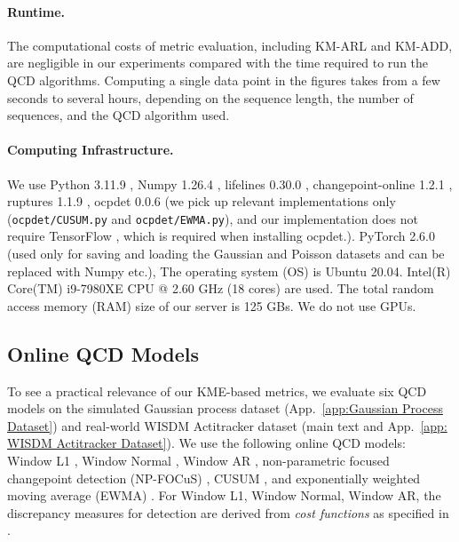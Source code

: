 \documentclass{article}
\theoremstyle{plain}
\theoremstyle{definition}
\theoremstyle{remark}
\begin{document}
\paragraph{Runtime.}
The computational costs of metric evaluation, including KM-ARL and KM-ADD, are negligible in our experiments compared with the time required to run the QCD algorithms. Computing a single data point in the figures takes from a few seconds to several hours, depending on the sequence length, the number of sequences, and the QCD algorithm used.

\paragraph{Computing Infrastructure.}
We use Python 3.11.9 \citep{Python3}, 
Numpy 1.26.4 \citep{numpy}, 
lifelines 0.30.0 \citep{lifelines}, 
changepoint-online 1.2.1 \citep{changepoint_online}, 
ruptures 1.1.9 \citep{ruptures}, 
ocpdet 0.0.6 \citep{ocpdet} (we pick up relevant implementations only (\texttt{ocpdet/CUSUM.py} and \texttt{ocpdet/EWMA.py}), and our implementation does not require TensorFlow \citep{tensorflow}, which is required when installing ocpdet.).
PyTorch 2.6.0 \citep{pytorch} (used only for saving and loading the Gaussian and Poisson datasets and can be replaced with Numpy etc.), 
The operating system (OS) is Ubuntu 20.04.
Intel(R) Core(TM) i9-7980XE CPU @ 2.60 GHz (18 cores) are used.
The total random access memory (RAM) size of our server is 125 GBs.
We do not use GPUs.






\subsection{Online QCD Models} \label{app:Online QCD Models}
To see a practical relevance of our KME-based metrics, we evaluate six QCD models on the simulated Gaussian process dataset (App.~\ref{app:Gaussian Process Dataset}) and real-world WISDM Actitracker dataset (main text and App.~\ref{app: WISDM Actitracker Dataset}).
We use the following online QCD models: Window L1 \citep{bai1995least}, Window Normal \citep{lavielle1999detection, lavielle2006detection}, Window AR \citep{bai2000vector}, non-parametric focused changepoint detection (NP-FOCuS) \citep{NP_FOCuS}, CUSUM \citep{page1954continuous_CUSUM_org}, and exponentially weighted moving average (EWMA) \citep{roberts2000control_EWMA_org}.
For Window L1, Window Normal, Window AR, the discrepancy measures for detection are derived from \textit{cost functions} as specified in \citep{ruptures}.
\end{document}
